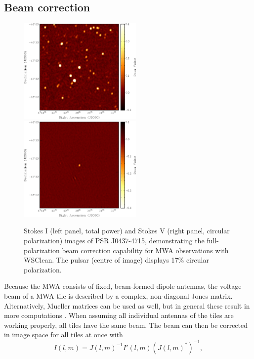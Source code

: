 \documentclass[useAMS,usenatbib]{mn2e}
\begin{document}
\subsection{Beam correction}
\begin{figure}
\begin{center}
\includegraphics[width=6cm]{img/pulsar-stokesi}\hspace{1cm}\includegraphics[width=6cm]{img/pulsar-stokesv}
\caption{Stokes I (left panel, total power) and Stokes V (right panel, circular polarization) images of PSR J0437-4715, demonstrating the full-polarization beam correction capability for MWA observations with WSClean. The pulsar (centre of image) displays 17\% circular polarization.}
\label{fig:pulsar-stokes-iv}
\end{center}
\end{figure}
Because the MWA consists of fixed, beam-formed dipole antennas, the voltage beam of a MWA tile is described by a complex, non-diagonal Jones matrix. Alternatively, Mueller matrices can be used as well, but in general these result in more computations \citep{revisiting-me-i}. When assuming all individual antennas of the tiles are working properly, all tiles have the same beam. The beam can then be corrected in image space for all tiles at once with
\begin{equation}\label{eq:beam-correction}
 I(l, m) = J(l,m)^{-1} I'(l, m) \left(J(l,m)^*\right)^{-1},
\end{equation}
\end{document}
